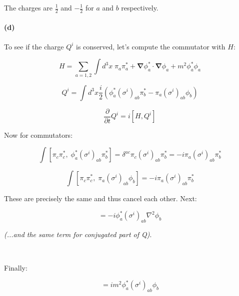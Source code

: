 \documentclass[11pt]{article}
\begin{document}
The charges are $\frac{1}{2}$ and $-\frac{1}{2}$ for $a$ and $b$
respectively.

\pagebreak

\paragraph*{(d)}

To see if the charge $Q^i$ is conserved, let's compute the commutator
with $H$:

\begin{equation}
H = \sum_{a=1,2} \int d^3x \; \pi_a \pi_a^* +
    \mathbf{\nabla} \phi_a^* \cdot \mathbf{\nabla} \phi_a +
    m^2 \phi_a^* \phi_a
\end{equation}
    
\begin{equation}
Q^i = \int d^3x \frac{i}{2} \left(
  \phi_a^* \left( \sigma^i \right)_{ab} \pi_b^* -
  \pi_a \left( \sigma^i \right)_{ab} \phi_b
  \right)
\end{equation}

\begin{equation}
\frac{\partial}{\partial t} Q^i = i [ H, Q^i ]
\end{equation}

Now for commutators:

\begin{equation}
\int
  [ \pi_c \pi^*_c, \; \phi^*_a \left(\sigma^i\right)_{ab} \pi^*_b ] =
  \delta^{ac} \pi_c \left(\sigma^i\right)_{ab} \pi^*_b =
  -i \pi_a \left(\sigma^i\right)_{ab} \pi^*_b
\end{equation}

\begin{equation}
\int
  [ \pi_c \pi^*_c, \; \pi_a \left(\sigma^i\right)_{ab} \phi_b ] =
  -i \pi_a \left(\sigma^i\right)_{ab} \pi^*_b
\end{equation}

These are precisely the same and thus cancel each other. Next:

\begin{equation}
[ \nabla \phi^*_c \cdot \nabla \phi_c,
  \; \phi^*_a \left(\sigma^i\right)_{ab} \pi^*_b] =
  -i \phi^*_a \left(\sigma^i\right)_{ab} \nabla^2 \phi_b
\end{equation}

\textit{(...and the same term for conjugated part of Q)}.

\

Finally:

\begin{equation}
[ m^2 \phi^*_c \phi_c,
  \; \phi^*_a \left(\sigma^i\right)_{ab} \pi^*_b ] =
  i m^2 \phi^*_a \left(\sigma^i\right)_{ab} \phi_b
\end{equation}
  
\end{document}
